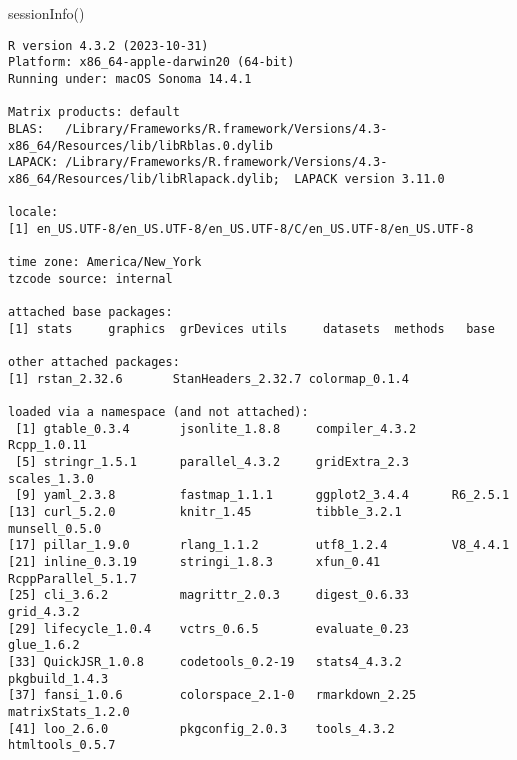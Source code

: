 \documentclass[
  letterpaper,
  DIV=11,
  numbers=noendperiod]{scrartcl}
\newenvironment{Shaded}{\begin{snugshade}}{\end{snugshade}}
\newcommand{\FunctionTok}[1]{\textcolor[rgb]{0.28,0.35,0.67}{#1}}
\newcommand{\NormalTok}[1]{\textcolor[rgb]{0.00,0.23,0.31}{#1}}
\begin{document}
\begin{Shaded}
\begin{Highlighting}[]
\FunctionTok{sessionInfo}\NormalTok{()}
\end{Highlighting}
\end{Shaded}

\begin{verbatim}
R version 4.3.2 (2023-10-31)
Platform: x86_64-apple-darwin20 (64-bit)
Running under: macOS Sonoma 14.4.1

Matrix products: default
BLAS:   /Library/Frameworks/R.framework/Versions/4.3-x86_64/Resources/lib/libRblas.0.dylib 
LAPACK: /Library/Frameworks/R.framework/Versions/4.3-x86_64/Resources/lib/libRlapack.dylib;  LAPACK version 3.11.0

locale:
[1] en_US.UTF-8/en_US.UTF-8/en_US.UTF-8/C/en_US.UTF-8/en_US.UTF-8

time zone: America/New_York
tzcode source: internal

attached base packages:
[1] stats     graphics  grDevices utils     datasets  methods   base     

other attached packages:
[1] rstan_2.32.6       StanHeaders_2.32.7 colormap_0.1.4    

loaded via a namespace (and not attached):
 [1] gtable_0.3.4       jsonlite_1.8.8     compiler_4.3.2     Rcpp_1.0.11       
 [5] stringr_1.5.1      parallel_4.3.2     gridExtra_2.3      scales_1.3.0      
 [9] yaml_2.3.8         fastmap_1.1.1      ggplot2_3.4.4      R6_2.5.1          
[13] curl_5.2.0         knitr_1.45         tibble_3.2.1       munsell_0.5.0     
[17] pillar_1.9.0       rlang_1.1.2        utf8_1.2.4         V8_4.4.1          
[21] inline_0.3.19      stringi_1.8.3      xfun_0.41          RcppParallel_5.1.7
[25] cli_3.6.2          magrittr_2.0.3     digest_0.6.33      grid_4.3.2        
[29] lifecycle_1.0.4    vctrs_0.6.5        evaluate_0.23      glue_1.6.2        
[33] QuickJSR_1.0.8     codetools_0.2-19   stats4_4.3.2       pkgbuild_1.4.3    
[37] fansi_1.0.6        colorspace_2.1-0   rmarkdown_2.25     matrixStats_1.2.0 
[41] loo_2.6.0          pkgconfig_2.0.3    tools_4.3.2        htmltools_0.5.7   
\end{verbatim}
\end{document}
